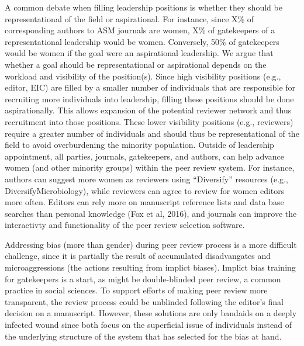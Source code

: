 \documentclass[11pt,]{article}
\begin{document}
A common debate when filling leadership positions is whether they should
be representational of the field or aspirational. For instance, since
X\% of corresponding authors to ASM journals are women, X\% of
gatekeepers of a representational leadership would be women. Conversely,
50\% of gatekeepers would be women if the goal were an aspirational
leadership. We argue that whether a goal should be representational or
aspirational depends on the workload and visibility of the position(s).
Since high visibility positions (e.g., editor, EIC) are filled by a
smaller number of individuals that are responsible for recruiting more
individuals into leadership, filling these positions should be done
aspirationally. This allows expansion of the potential reviewer network
and thus recruitment into those positions. These lower visibility
positions (e.g., reviewers) require a greater number of individuals and
should thus be representational of the field to avoid overburdening the
minority population. Outside of leadership appointment, all parties,
journals, gatekeepers, and authors, can help advance women (and other
minority groups) within the peer review system. For instance, authors
can suggest more women as reviewers using ``Diversify'' resources (e.g.,
DiversifyMicrobiology), while reviewers can agree to review for women
editors more often. Editors can rely more on manuscript reference lists
and data base searches than personal knowledge (Fox et al, 2016), and
journals can improve the interactivty and functionality of the peer
review selection software.

Addressing bias (more than gender) during peer review process is a more
difficult challenge, since it is partially the result of accumulated
disadvangates and microaggressions (the actions resulting from implict
biases). Implict bias training for gatekeepers is a start, as might be
double-blinded peer review, a common practice in social sciences. To
support efforts of making peer review more transparent, the review
process could be unblinded following the editor's final decision on a
manuscript. However, these solutions are only bandaids on a deeply
infected wound since both focus on the superficial issue of individuals
instead of the underlying structure of the system that has selected for
the bias at hand.
\end{document}

